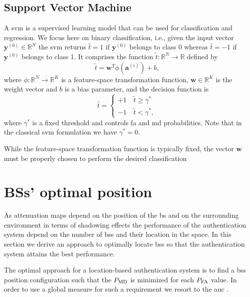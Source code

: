 \documentclass[twocolumns]{IEEEtran}
\begin{document}
\subsection{Support Vector Machine}\label{sec:svm}
A \ac{svm} \cite{Bishop2006} is a supervised learning model that can be used for classification and regression. We focus here on binary classification, i.e., given the input vector $\bm{y}^{(0)} \in \mathbb{R}^N$ the \ac{svm} returns $\hat{t} = 1$ if $\bm{y}^{(0)}$ belongs to class 0 whereas $\hat{t}=-1$ if $\bm{y}^{(0)}$ belongs to class 1. It comprises the function $\tilde{t}: \mathbb{R}^N \to \mathbb{R}$ defined by
\begin{equation}
\label{eq:svm}
\tilde{t} = \mathbf{w}^T \phi (\mathbf{a}^{(i)}) + b,
\end{equation}
where $\phi: \mathbb{R}^N \to \mathbb{R}^K$ is a feature-space transformation function, $\mathbf{w} \in \mathbb{R}^K$ is the weight vector and $b$ is a bias parameter, and the decision function is
\begin{equation}
\label{eq:cases}
\hat{t} = 
\begin{cases}
+1 \quad \tilde{t}  \geq \gamma^* \\
-1 \quad \tilde{t}  < \gamma^*,
\end{cases}		
\end{equation} 
where $\gamma^*$ is a fixed threshold and controls \ac{fa} and \ac{md} probabilities. Note that in the classical \ac{svm} formulation we have $\gamma^* = 0$.

While the feature-space transformation function is typically fixed, the vector $\mathbf{w}$ must be properly chosen to perform the desired classification

\section{BSs' optimal position}\label{sec:bsPos}
As attenuation maps depend on the position of the \ac{bs} and on the surrounding environment in terms of shadowing effects the performance of the authentication system depend on the number of \acp{bs} and their location in the space. In this section we derive an approach to optimally locate \acp{bs} so that the authentication system attains the best performance. 

The optimal approach for a location-based authentication system is to find a \acp{bs} position configuration such that the $P_{\rm MD}$ is minimized for each $P_{\rm FA}$ value. In order to use a global measure for such a requirement we resort to the \ac{auc} \cite{hanley-82}. 
\end{document}
